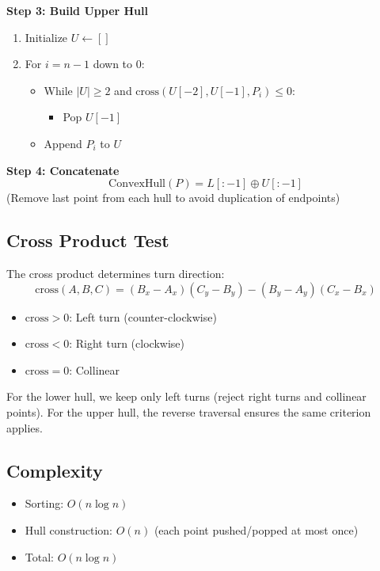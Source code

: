 \documentclass[9pt,a4paper,twocolumn,twoside]{tau-class/tau}
\begin{document}
    \textbf{Step 3: Build Upper Hull}
    \begin{enumerate}
        \item Initialize $U \leftarrow []$
        \item For $i = n-1$ down to $0$:
        \begin{itemize}
            \item While $|U| \geq 2$ and $\text{cross}(U[-2], U[-1], P_i) \leq 0$:
            \begin{itemize}
                \item Pop $U[-1]$
            \end{itemize}
            \item Append $P_i$ to $U$
        \end{itemize}
    \end{enumerate}

    \textbf{Step 4: Concatenate}
    \begin{equation}
        \text{ConvexHull}(P) = L[:-1] \oplus U[:-1]
    \end{equation}
    (Remove last point from each hull to avoid duplication of endpoints)

    \subsection{Cross Product Test}

    The cross product determines turn direction:
    \begin{equation}
        \text{cross}(A, B, C) = (B_x - A_x)(C_y - B_y) - (B_y - A_y)(C_x - B_x)
    \end{equation}
    \begin{itemize}
        \item $\text{cross} > 0$: Left turn (counter-clockwise)
        \item $\text{cross} < 0$: Right turn (clockwise)
        \item $\text{cross} = 0$: Collinear
    \end{itemize}

    For the lower hull, we keep only left turns (reject right turns and collinear points). For the upper hull, the reverse traversal ensures the same criterion applies.

    \subsection{Complexity}

    \begin{itemize}
        \item Sorting: $O(n \log n)$
        \item Hull construction: $O(n)$ (each point pushed/popped at most once)
        \item Total: $O(n \log n)$
    \end{itemize}
\end{document}
